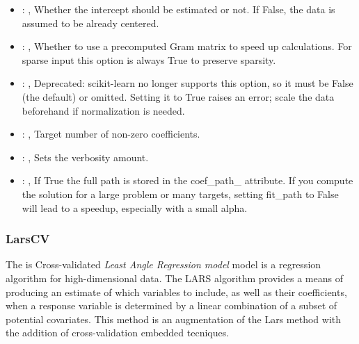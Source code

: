 \begin{itemize}
    \item {}: ,
      Whether the intercept should be estimated or not. If False,
      the data is assumed to be already centered.

    \item {}: ,
      Whether to use a precomputed Gram matrix to speed up calculations.
      For sparse input this option is always True to preserve sparsity.

    \item {}: ,
      Deprecated: scikit-learn no longer supports this option, so it must be False (the default) or
      omitted.                                                  Setting it to True raises an error;
      scale the data beforehand if normalization is needed.

    \item {}: ,
      Target number of non-zero coefficients.

    \item {}: ,
      Sets the verbosity amount.

    \item {}: ,
      If True the full path is stored in the coef\_path\_ attribute.
      If you compute the solution for a large problem or many targets,
      setting fit\_path to False will lead to a speedup, especially with a
      small alpha.
  \end{itemize}


\subsubsection{LarsCV}
  The  is Cross-validated \textit{Least Angle Regression model} model
  is a regression algorithm for high-dimensional data.                         The LARS algorithm
  provides a means of producing an estimate of which variables                         to include,
  as well as their coefficients, when a response variable is                         determined by a
  linear combination of a subset of potential covariates.                         This method is an
  augmentation of the Lars method with the addition of cross-validation
  embedded tecniques.                         

